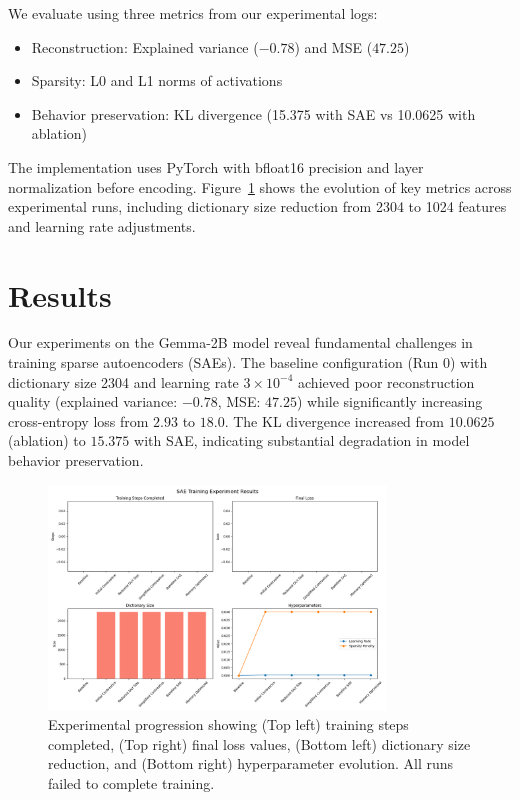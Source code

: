 \documentclass{article} %
\begin{document}
We evaluate using three metrics from our experimental logs:
\begin{itemize}
    \item Reconstruction: Explained variance ($-0.78$) and MSE ($47.25$)
    \item Sparsity: L0 and L1 norms of activations
    \item Behavior preservation: KL divergence (15.375 with SAE vs 10.0625 with ablation)
\end{itemize}

The implementation uses PyTorch with bfloat16 precision and layer normalization before encoding. Figure~\ref{fig:experiment_progression} shows the evolution of key metrics across experimental runs, including dictionary size reduction from 2304 to 1024 features and learning rate adjustments.

\section{Results}
\label{sec:results}

Our experiments on the Gemma-2B model reveal fundamental challenges in training sparse autoencoders (SAEs). The baseline configuration (Run 0) with dictionary size 2304 and learning rate $3\times10^{-4}$ achieved poor reconstruction quality (explained variance: $-0.78$, MSE: $47.25$) while significantly increasing cross-entropy loss from $2.93$ to $18.0$. The KL divergence increased from $10.0625$ (ablation) to $15.375$ with SAE, indicating substantial degradation in model behavior preservation.

\begin{figure}[h]
    \centering
    \includegraphics[width=0.8\textwidth]{experiment_results.png}
    \caption{Experimental progression showing (Top left) training steps completed, (Top right) final loss values, (Bottom left) dictionary size reduction, and (Bottom right) hyperparameter evolution. All runs failed to complete training.}
    \label{fig:experiment_progression}
\end{figure}
\end{document}
